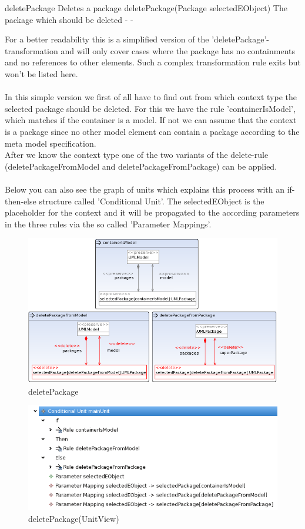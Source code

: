 \op
{deletePackage}
{Deletes a package}
{deletePackage(Package selectedEObject)}
{The package which should be deleted }
{-}
{-}
{For a better readability this is a simplified version of the
'deletePackage'-transformation and will only cover cases where the
package has no containments and no references to other elements. Such a
complex transformation rule exits but won't be listed here.
\\\\
In this simple version we first of all have to find out from which context type
the selected package should be deleted. For this we have the rule 'containerIsModel', which matches if the
container is a model. If not we can assume that the context is a package since
no other model element can contain a package according to the meta model specification.\\
After we know the context type one of the two variants of the delete-rule
(deletePackageFromModel and deletePackageFromPackage) can be applied.\\\\
Below you can also see the graph of units which explains this process with
an if-then-else structure called 'Conditional Unit'. The selectedEObject is the
placeholder for the context and it will be propagated to the according
parameters in the three rules via the so called 'Parameter Mappings'.

}
\begin{figure}[H]
  \advance\leftskip-1.5cm
  \includegraphics[width=1.2\textwidth]{pics/deletePackage_emptyAndUnreferenced.png}
  \caption{deletePackage}
  \label{deletePackage}
\end{figure}
\begin{figure}[H]
  \centering
  \includegraphics[width=1.0\textwidth]{pics/deletePackage_emptyAndUnreferenced_TreeView.png}
  \caption{deletePackage(UnitView)}
  \label{deletePackage}
\end{figure}
